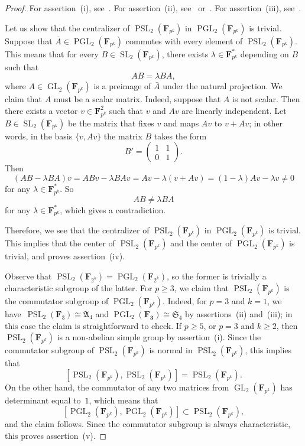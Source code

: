\documentclass[12pt]{amsart}
\numberwithin{equation}{section}
\theoremstyle{definition}
\DeclareMathOperator{\GL}{GL}
\DeclareMathOperator{\SL}{SL}
\DeclareMathOperator{\PGL}{PGL}
\DeclareMathOperator{\PSL}{PSL}
\def \ge {\geqslant}
\begin{document}
\begin{proof}
For assertion~(i), see~\mbox{\cite[\S3.3.2]{Wilson}}.
For assertion~(ii), see~\mbox{\cite[\S3.3.5]{Wilson}}
or~\mbox{\cite[\S10.1]{Serre-FiniteGroups}}.
For assertion~(iii), see~\mbox{\cite[\S10.1]{Serre-FiniteGroups}}.


Let us show that the centralizer of $\PSL_2(\mathbf{F}_{p^k})$ in $\PGL_2(\mathbf{F}_{p^k})$
is trivial. Suppose that $\bar{A}\in\PGL_2(\mathbf{F}_{p^k})$ commutes with every element of $\PSL_2(\mathbf{F}_{p^k})$. This means that for every $B\in\SL_2(\mathbf{F}_{p^k})$, there exists $\lambda\in\mathbf{F}_{p^k}^*$ depending on $B$ such that
$$
AB=\lambda BA,
$$
where $A\in \GL_2(\mathbf{F}_{p^k})$ is a preimage of
$\bar{A}$ under the natural projection.
We claim that $A$ must be a scalar matrix. Indeed, suppose that $A$ is not scalar. Then there exists a vector $v\in \mathbf{F}_{p^k}^2$ such that $v$ and $Av$ are linearly independent.
Let~\mbox{$B\in \SL_2(\mathbf{F}_{p^k})$} be the matrix that fixes $v$ and maps $Av$ to $v+Av$;
in other words, in the basis $\{v,Av\}$ the matrix $B$ takes the form
$$
B'=\left(
\begin{array}{cc}
1 & 1\\
0 & 1
\end{array}
\right).
$$
Then
$$
(AB-\lambda BA)v =ABv-\lambda BAv=Av-\lambda(v+Av)=(1-\lambda)Av-\lambda v\neq 0
$$
for any $\lambda\in\mathbf{F}_{p^k}^*$.
So
$$
AB\neq \lambda BA
$$
for any $\lambda\in\mathbf{F}_{p^k}^*$, which gives a contradiction.

Therefore, we see that the centralizer of $\PSL_2(\mathbf{F}_{p^k})$ in $\PGL_2(\mathbf{F}_{p^k})$ is trivial. This implies that the center of
$\PSL_2(\mathbf{F}_{p^k})$ and the center of $\PGL_2(\mathbf{F}_{p^k})$
is trivial, and proves assertion~(iv).

Observe that $\PSL_2(\mathbf{F}_{2^k})=\PGL_2(\mathbf{F}_{2^k})$, so the former is trivially a characteristic subgroup of the latter.
For $p\ge 3$, we claim that $\PSL_2(\mathbf{F}_{p^k})$ is the commutator subgroup of  $\PGL_2(\mathbf{F}_{p^k})$. Indeed, for
$p=3$ and $k=1$, we have~\mbox{$\PSL_2(\mathbf{F}_3)\cong\mathfrak{A}_4$} and $\PGL_2(\mathbf{F_3})\cong\mathfrak{S}_4$ by assertions~(ii) and~(iii);
in this case the claim is straightforward to check.
If $p\ge 5$, or $p=3$ and $k\ge 2$, then~\mbox{$\PSL_2(\mathbf{F}_{p^k})$} is a non-abelian simple group by assertion~(i).
Since the commutator subgroup of $\PSL_2(\mathbf{F}_{p^k})$ is normal in $\PSL_2(\mathbf{F}_{p^k})$, this implies that
$$
[\PSL_2(\mathbf{F}_{p^k}),\PSL_2(\mathbf{F}_{p^k})]=\PSL_2(\mathbf{F}_{p^k}).
$$
On the other hand, the commutator of any two matrices
from $\GL_2(\mathbf{F}_{p^k})$ has determinant equal to~$1$, which means that
$$
[\PGL_2(\mathbf{F}_{p^k}),\PGL_2(\mathbf{F}_{p^k})]\subset\PSL_2(\mathbf{F}_{p^k}),
$$
and the claim follows. Since the commutator subgroup is always
characteristic, this proves assertion~(v).
\end{proof}
\end{document}
